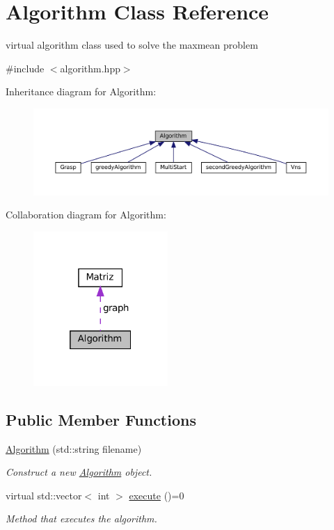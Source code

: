 \hypertarget{classAlgorithm}{}\section{Algorithm Class Reference}
\label{classAlgorithm}


virtual algorithm class used to solve the maxmean problem  




{\ttfamily \#include $<$algorithm.\+hpp$>$}



Inheritance diagram for Algorithm\+:
\nopagebreak
\begin{figure}[H]
\begin{center}
\leavevmode
\includegraphics[width=350pt]{classAlgorithm__inherit__graph}
\end{center}
\end{figure}


Collaboration diagram for Algorithm\+:
\nopagebreak
\begin{figure}[H]
\begin{center}
\leavevmode
\includegraphics[width=145pt]{classAlgorithm__coll__graph}
\end{center}
\end{figure}
\subsection*{Public Member Functions}
\begin{DoxyCompactItemize}
\item 
\hyperlink{classAlgorithm_a89df1d2c6751f70733f38daa0ee2a13b}{Algorithm} (std\+::string filename)
\begin{DoxyCompactList}\small\item\em Construct a new \hyperlink{classAlgorithm}{Algorithm} object. \end{DoxyCompactList}\item 
virtual std\+::vector$<$ int $>$ \hyperlink{classAlgorithm_af6ea9eb9a6dbd41896e3fd7dabac096b}{execute} ()=0
\begin{DoxyCompactList}\small\item\em Method that executes the algorithm. \end{DoxyCompactList}\end{DoxyCompactItemize}
